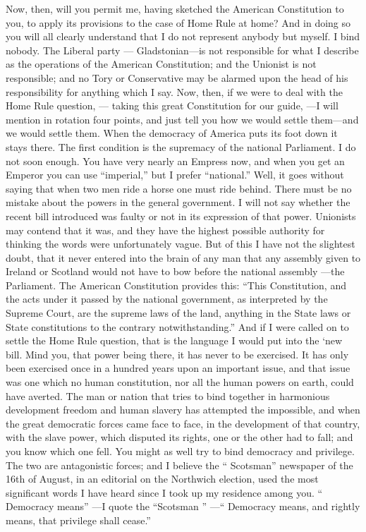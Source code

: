 \documentclass[11pt,openany]{book}
\begin{document}
Now, then, will you permit me, having sketched the American Constitution to you, to apply its provisions to the case of Home Rule at home? And in doing so you will all clearly understand that I do not represent anybody but myself. I bind nobody. The Liberal party --- Gladstonian---is not responsible for what I describe as the operations of the American Constitution; and the Unionist is not responsible; and no Tory or Conservative may be alarmed upon the head of his responsibility for anything which I say. Now, then, if we were to deal with the Home Rule question, --- taking this great Constitution for our guide, ---I will mention in rotation four points, and just tell you how we would settle them---and we would settle them. When the democracy of America puts its foot down it stays there. The first condition is the supremacy of the national Parliament. I do not soon enough. You have very nearly an Empress now, and when you get an Emperor you can use ``imperial,'' but I prefer ``national.'' Well, it goes without saying that when two men ride a horse one must ride behind. There must be no mistake about the powers in the general government. I will not say whether the recent bill introduced was faulty or not in its expression of that power. Unionists may contend that it was, and they have the highest possible authority for thinking the words were unfortunately vague. But of this I have not the slightest doubt, that it never entered into the brain of any man that any assembly given to Ireland or Scotland would not have to bow before the national assembly ---the Parliament. The American Constitution provides this: ``This Constitution, and the acts under it passed by the national government, as interpreted by the Supreme Court, are the supreme laws of the land, anything in the State laws or State constitutions to the contrary notwithstanding.'' And if I were called on to settle the Home Rule question, that is the language I would put into the `new bill. Mind you, that power being there, it has never to be exercised. It has only been exercised once in a hundred years upon an important issue, and that issue was one which no human constitution, nor all the human powers on earth, could have averted. The man or nation that tries to bind together in harmonious development freedom and human slavery has attempted the impossible, and when the great democratic forces came face to face, in the development of that country, with the slave power, which disputed its rights, one or the other had to fall; and you know which one fell. You might as well try to bind democracy and privilege. The two are antagonistic forces; and I believe the `` Scotsman'' newspaper of the 16th of August, in an editorial on the Northwich election, used the most significant words I have heard since I took up my residence among you. `` Democracy means'' ---I quote the ``Scotsman '' ---`` Democracy means, and rightly means, that privilege shall cease.''
\end{document}
